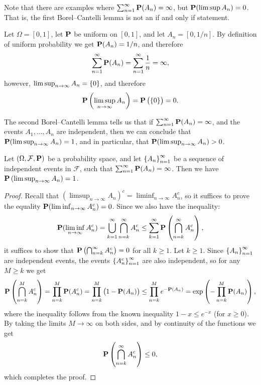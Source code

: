 \documentclass[11pt,a4paper]{article}
\begin{document}
\begin{remark}
  Note that there are examples where $\sum_{n=1}^{\infty} \mathbf{P}(A_n) = \infty$,
  but $\mathbf{P}(\limsup A_n) = 0$.
  That is, the first Borel--Cantelli lemma is not an if and only if
  statement.
\end{remark}
\begin{example}
  Let $\Omega = [0,1]$, let $\mathbf{P}$ be uniform on $[0,1]$,
  and let $A_n = [0,1/n]$.
  By definition of uniform probability we get
  $\mathbf{P}(A_n) = 1/n$, and therefore
  \[
    \sum_{n=1}^{\infty} \mathbf{P}(A_n) =
    \sum_{n=1}^{\infty} \frac{1}{n} = \infty,
  \]
  however, $\limsup_{n \to \infty} A_n = \left\{0\right\}$,
  and therefore
  \[
    \mathbf{P}\left(\limsup_{n \to \infty} A_n\right) =
    \mathbf{P}\left(\left\{0\right\}\right) = 0.
  \]
\end{example}

\begin{remark}
  The second Borel--Cantelli lemma tells us that if
  $\sum_{n=1}^{\infty} \mathbf{P}(A_n) = \infty$,
  and the events $A_1,\dots,A_n$ are independent,
  then we can conclude that $\mathbf{P}(\limsup_{n \to \infty} A_n) = 1$,
  and in particular, that $\mathbf{P}(\limsup_{n \to \infty} A_n) > 0$.
\end{remark}

\begin{lemma}
  Let $(\Omega, \mathcal F, \mathbf{P})$ be a probability space, and let
  $\left\{A_n\right\}_{n = 1}^{\infty}$
  be a sequence of independent events in $\mathcal F$,
  such that $\sum_{n=1}^{\infty} \mathbf{P}(A_n) = \infty$.
  Then we have $\mathbf{P}\left(\limsup_{n \to \infty} A_n\right) = 1$.
\end{lemma}
\begin{proof}
  Recall that $(\limsup_{n \to \infty} A_n)^c = \liminf_{n \to \infty} A_n^c$,
  so it suffices to prove the equality $\mathbf{P}(\liminf_{n \to \infty} A_n^c) = 0$.
  Since we also have the inequality:
  \[
    \Prob(\liminf_{n \to \infty} A_n^c) =
    \bigcup_{k=1}^{\infty} \bigcap_{n=k}^{\infty} A_n^c \le
    \sum_{k=1}^{\infty} \Prob\del{\bigcap_{n=k}^{\infty} A_n^c},
  \]
  it suffices to show that $\Prob\del{\bigcap_{n=k}^{\infty} A_n^c} = 0$
  for all $k \geq 1$.
  Let $k \geq 1$.
  Since $\left\{A_n\right\}_{n=1}^{\infty}$ are independent events,
  the events $\left\{A_n^c\right\}_{n=1}^{\infty}$ are also independent,
  so for any $M \geq k$ we get
  \[
    \Prob\del{\bigcap_{n=k}^{M} A_n^c} =
    \prod_{n=k}^{M} \Prob(A_n^c) =
    \prod_{n=k}^{M} \del{1 - \Prob(A_n)} \le
    \prod_{n=k}^{M} e^{-\Prob(A_n)} =
    \exp\del{-\prod_{n=k}^{M} \Prob(A_n)},
  \]
  where the inequality follows from the known inequality
  $1 - x \le e^{-x}$ (for $x \geq 0$).
  By taking the limits $M \to \infty$ on both sides,
  and by continuity of the functions we get
  \[
    \Prob\del{\bigcap_{n=k}^{\infty} A_n^c} \le
    0,
  \]
  which completes the proof.
\end{proof}
\end{document}
